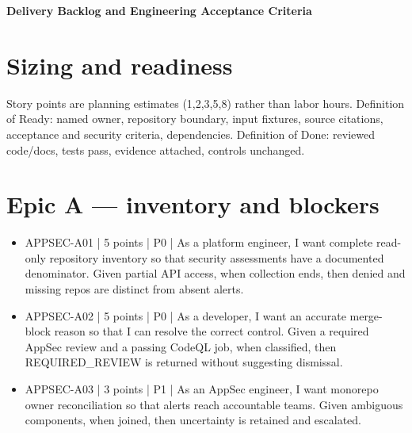 \documentclass[11pt,letterpaper]{article}
\begin{document}
\begin{center}
{\LARGE\bfseries Delivery Backlog and Engineering Acceptance Criteria}\par
\vspace{5pt}{\large Epics, story points and traceable implementation gates}\par
\vspace{9pt}{\small Engineering reference | Proposed design | Not a deployment or approval record}\par
\end{center}
\tableofcontents
\clearpage
\section{Sizing and readiness}
Story points are planning estimates (1,2,3,5,8) rather than labor hours. Definition of Ready: named owner, repository boundary, input fixtures, source citations, acceptance and security criteria, dependencies. Definition of Done: reviewed code/docs, tests pass, evidence attached, controls unchanged.


\section{Epic A — inventory and blockers}
\begin{itemize}
\item APPSEC-A01 | 5 points | P0 | As a platform engineer, I want complete read-only repository inventory so that security assessments have a documented denominator. Given partial API access, when collection ends, then denied and missing repos are distinct from absent alerts.
\item APPSEC-A02 | 5 points | P0 | As a developer, I want an accurate merge-block reason so that I can resolve the correct control. Given a required AppSec review and a passing CodeQL job, when classified, then REQUIRED\_REVIEW is returned without suggesting dismissal.
\item APPSEC-A03 | 3 points | P1 | As an AppSec engineer, I want monorepo owner reconciliation so that alerts reach accountable teams. Given ambiguous components, when joined, then uncertainty is retained and escalated.
\end{itemize}
\end{document}
